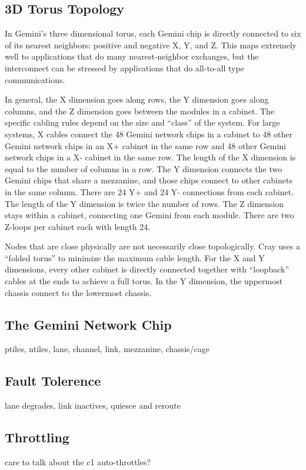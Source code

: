 \documentclass[10pt, conference, compsocconf]{IEEEtran}
\begin{document}
\subsection{3D Torus Topology}

In Gemini's three dimensional torus, each Gemini chip is directly connected to
six of its nearest neighbors: positive and negative X, Y, and Z.  This maps
extremely well to applications that do many nearest-neighbor exchanges, but the
interconnect can be stressed by applications that do all-to-all type
communications.

In general, the X dimension goes along rows, the Y dimension goes along
columns, and the Z dimension goes between the modules in a cabinet.  The
specific cabling rules depend on the size and ``class'' of the system.  For
large systems, X cables connect the 48 Gemini network chips in a cabinet to 48
other Gemini network chips in an X+ cabinet in the same row and 48 other Gemini
network chips in a X- cabinet in the same row.  The length of the X dimension
is equal to the number of columns in a row.  The Y dimension connects the two
Gemini chips that share a mezzanine, and those chips connect to other cabinets
in the same column.  There are 24 Y+ and 24 Y- connections from each cabinet.
The length of the Y dimension is twice the number of rows.  The Z dimension
stays within a cabinet, connecting one Gemini from each module.  There are two
Z-loops per cabinet each with length 24.

Nodes that are close physically are not necessarily close topologically.  Cray
uses a ``folded torus'' to minimize the maximum cable length.  For the X and Y
dimensions, every other cabinet is directly connected together with
``loopback'' cables at the ends to achieve a full torus.  In the Y dimension,
the uppermost chassis connect to the lowermost chassis.

\subsection{The Gemini Network Chip}
ptiles, ntiles, lane, channel, link, mezzanine, chassis/cage

\subsection{Fault Tolerence}
lane degrades, link inactives, quiesce and reroute

\subsection{Throttling}
care to talk about the c1 auto-throttles?
\end{document}
